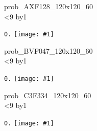 \documentclass{article}
\begin{document}
\def\w{.08\linewidth}

\def\subfig#1#2{
  \parbox{\w}{\center\small%
  \texttt{#2}
  \texttt{[image: \#1]}}}


\newcount\K
\def\putfigure#1{%
  \K=0 \loop\ifnum\K<9 \advance\K by1 %
  \subfig{#1step0.\number\K.pdf}{0.\number\K} %
  \repeat %
  }


\begin{center}

prob_AXF128_120x120_60\\
\putfigure{data/prob_AXF128_120x120_60}

\bigskip

prob_BVF047_120x120_60\\
\putfigure{data/prob_BVF047_120x120_60}

\bigskip

prob_C3F334_120x120_60\\
\putfigure{data/prob_C3F334_120x120_60}

\end{center}
 

 
\end{document}
